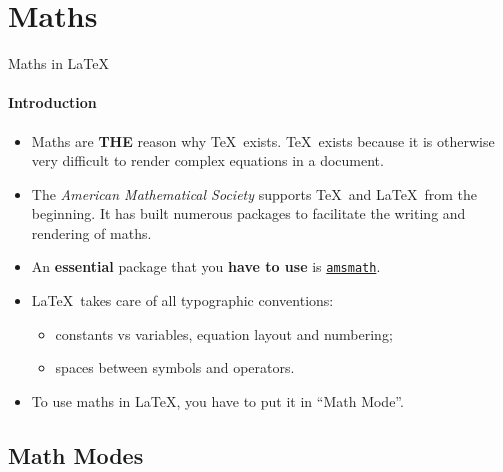 
\section{Maths}

\begin{frame}[c]{Maths in \LaTeX}
	\framesubtitle{Introduction}

	\begin{itemize}
		\item Maths are \textbf{THE} reason why \TeX\ exists. \TeX\ exists because it is otherwise very difficult to render complex equations in a document.
		\item The \emph{American Mathematical Society} supports \TeX\ and \LaTeX\ from the beginning. It has built numerous packages to facilitate the writing and rendering of maths.
		\item An \textbf{essential} package that you \textbf{have to use} is
		\href{https://ctan.org/pkg/amsmath}{\texttt{amsmath}}.
		\item \LaTeX\ takes care of all typographic conventions:
		\begin{itemize}
			\scriptsize
			\item constants vs variables, equation layout and numbering;
			\item spaces between symbols and operators.
		\end{itemize}
		\item To use maths in \LaTeX, you have to put it in ``Math Mode''.
	\end{itemize}
\end{frame}

\subsection{Math Modes}

